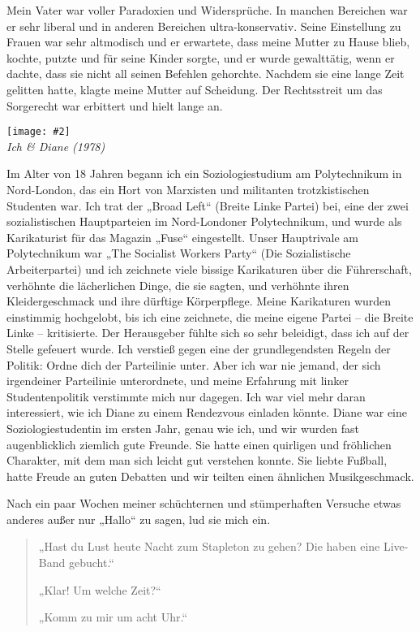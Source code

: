 \documentclass[12pt]{memoir}
\newcommand{\img}[3]{\begin{center}%
\texttt{[image: \#2]}\\{\small\em#3}%
\end{center}}
\begin{document}
Mein Vater war voller Paradoxien und Widersprüche.
In manchen Bereichen war er sehr liberal
und in anderen Bereichen ultra-konservativ.
Seine Einstellung zu Frauen war sehr altmodisch und er erwartete,
dass meine Mutter zu Hause blieb, kochte, putzte und für seine Kinder sorgte,
und er wurde gewalttätig, wenn er dachte,
dass sie nicht all seinen Befehlen gehorchte.
Nachdem sie eine lange Zeit gelitten hatte, klagte meine Mutter auf Scheidung.
Der Rechtsstreit um das Sorgerecht war erbittert und hielt lange an.

\img{scale=0.3}{Hassan_and_Diane.jpg}
{Ich \& Diane (1978)}

Im Alter von 18 Jahren begann ich ein Soziologiestudium
am Polytechnikum in Nord-London,
das ein Hort von Marxisten und militanten trotzkistischen Studenten war.
Ich trat der „Broad Left“ (Breite Linke Partei) bei,
eine der zwei sozialistischen Hauptparteien im Nord-Londoner Polytechnikum,
und wurde als Karikaturist für das Magazin „Fuse“ eingestellt.
Unser Hauptrivale am Polytechnikum war „The Socialist Workers Party“
(Die Sozialistische Arbeiterpartei) und ich zeichnete
viele bissige Karikaturen über die Führerschaft,
verhöhnte die lächerlichen Dinge, die sie sagten,
und verhöhnte ihren Kleidergeschmack und ihre dürftige Körperpflege.
Meine Karikaturen wurden einstimmig hochgelobt, bis ich eine zeichnete,
die meine eigene Partei – die Breite Linke – kritisierte.
Der Herausgeber fühlte sich so sehr beleidigt,
dass ich auf der Stelle gefeuert wurde.
Ich verstieß gegen eine der grundlegendsten Regeln der Politik:
Ordne dich der Parteilinie unter.
Aber ich war nie jemand, der sich irgendeiner Parteilinie unterordnete,
und meine Erfahrung mit linker Studentenpolitik verstimmte mich nur dagegen.
Ich war viel mehr daran interessiert,
wie ich Diane zu einem Rendezvous einladen könnte.
Diane war eine Soziologiestudentin im ersten Jahr, genau wie ich,
und wir wurden fast augenblicklich ziemlich gute Freunde.
Sie hatte einen quirligen und fröhlichen Charakter,
mit dem man sich leicht gut verstehen konnte.
Sie liebte Fußball, hatte Freude an guten Debatten
und wir teilten einen ähnlichen Musikgeschmack.

Nach ein paar Wochen meiner schüchternen und stümperhaften Versuche
etwas anderes außer nur „Hallo“ zu sagen, lud sie mich ein.

\begin{quote}
„Hast du Lust heute Nacht zum Stapleton zu gehen?
Die haben eine Live-Band gebucht.“

„Klar! Um welche Zeit?“

„Komm zu mir um acht Uhr.“
\end{quote}
\end{document}

